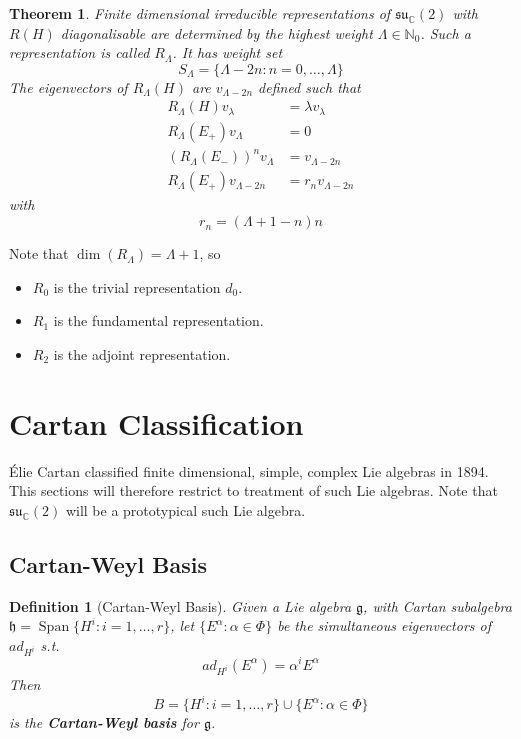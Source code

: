 \documentclass{article}
\newtheorem{theorem}{Theorem}[subsection]
\newtheorem{definition}{Definition}[subsection]
\DeclareMathOperator{\spn}{Span}
\newcommand{\bam}[1]{\textbf{#1}}
\newcommand{\mf}[1]{\mathfrak{#1}}
\newcommand{\mbb}[1]{\mathbb{#1}}
\begin{document}
\begin{theorem}
Finite dimensional irreducible representations of $\mf{su}_\mbb{C}(2)$ with $R(H)$ diagonalisable are determined by the highest weight $\Lambda\in\mbb{N}_0$. Such a representation is called $R_\Lambda$. It has weight set 
\[
S_\Lambda=\lbrace \Lambda-2n : n=0,\dots,\Lambda \rbrace
\]
The eigenvectors of $R_\Lambda(H)$ are $v_{\Lambda-2n}$ defined such that 
\begin{align*}
R_\Lambda(H) v_\lambda &= \lambda v_\lambda \\
R_\Lambda(E_+) v_\Lambda &= 0 \\
 \left(R_\Lambda(E_-)\right)^n v_{\Lambda} &= v_{\Lambda-2n} \\
 R_\Lambda(E_+) v_{\Lambda-2n} &= r_n v_{\Lambda-2n}
\end{align*}
with 
\[
r_n=(\Lambda+1-n)n
\]
\end{theorem}
Note that $\dim(R_\Lambda)=\Lambda+1$, so 
\begin{itemize}
    \item $R_0$ is the trivial representation $d_0$.
    \item $R_1$ is the fundamental representation.
    \item $R_2$ is the adjoint representation. 
\end{itemize}
\section{Cartan Classification}
\'Elie Cartan classified finite dimensional, simple, complex Lie algebras in 1894. This sections will therefore restrict to treatment of such Lie algebras. Note that $\mf{su}_\mbb{C}(2)$ will be a prototypical such Lie algebra. 

\subsection{Cartan-Weyl Basis}

\begin{definition}[Cartan-Weyl Basis]
Given a Lie algebra $\mf{g}$, with Cartan subalgebra $\mf{h}=\spn\lbrace H^i : i=1,\dots,r\rbrace$, let $\lbrace E^\alpha : \alpha\in\Phi \rbrace$ be the simultaneous eigenvectors of $ad_{H^i}$ s.t. 
\[
ad_{H^i}\left(E^\alpha \right)=\alpha^i E^\alpha
\]
Then 
\[
B=\lbrace H^i : i=1,\dots,r\rbrace \cup \lbrace E^\alpha : \alpha\in\Phi \rbrace
\]
is the \bam{Cartan-Weyl basis} for $\mf{g}$.
\end{definition}
\end{document}
